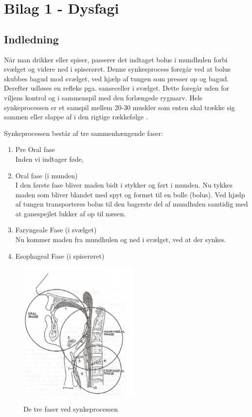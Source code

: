 \documentclass[main.tex]{subfiles}
\begin{document}
\chapter*{Bilag 1 - Dysfagi}
\label{Bilag1}
\section*{Indledning}
Når man drikker eller spiser, passerer det indtaget bolus i mundhulen forbi svælget og videre ned i spiserøret. Denne synkesprocess foregår ved at bolus skubbes bagud mod svælget, ved hjælp af tungen som presser op og bagud. Derefter udløses en refleks pga. sanseceller i svælget. Dette foregår uden for viljens kontrol og i sammenspil med den forlængede rygmarv. Hele synkeprocessen er et samspil mellem 20-30 muskler som enten skal trække sig sammen eller slappe af i den rigtige rækkefølge \cite{Sand2008MennesketsFysiologi}. 

Synkeprocessen består af tre sammenhængende faser:
\begin{enumerate}
\item Pre Oral fase\\
Inden vi indtager føde, 
\item Oral fase (i munden)\\
I den første fase bliver maden bidt i stykker og ført i munden. Nu tykkes maden som bliver blandet med spyt og formet til en bolle (bolus). Ved hjælp af tungen transporteres bolus til den bagerste del af mundhulen samtidig med at ganespejlet lukker af op til næsen.
\item Faryngeale Fase (i svælget)\\
Nu kommer maden fra mundhulen og ned i svælget, ved at der synkes. 
\item Esophageal Fase (i spiserøret)\cite{Bass1992Dysphagia:Management}
\end{enumerate}

\begin{figure}[H]
\centering
{\includegraphics[width=6cm]
{Figure/dysfagi3faser}}
\caption{De tre faser ved synkeprocessen\cite{Bass1992Dysphagia:Management}}
\label{trefaser}
\end{figure}
\end{document}
